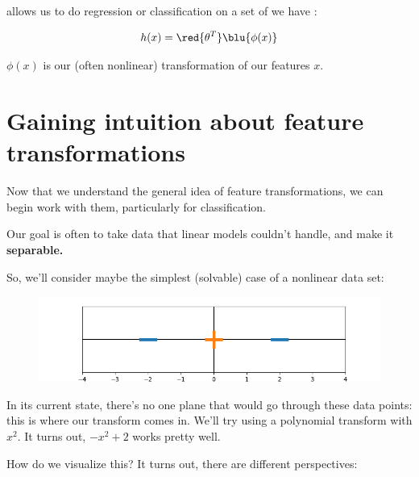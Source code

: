         \begin{definition}
             allows us to do  regression or classification on a set of  we have  :

            \begin{equation*}
                h(x) = 
            \red{\theta^T} 
            \blu{\phi(x)}
            \end{equation*}

            $\phi(x)$ is our (often nonlinear) transformation of our features $x$.
        \end{definition}

    \secdiv

    \pagebreak

    \section{Gaining intuition about feature transformations}

        Now that we understand the general idea of feature transformations, we can begin work with them, particularly for classification.

        Our goal is often to take data that linear models couldn't handle, and make it \textbf{separable.} 

        So, we'll consider maybe the simplest (solvable) case of a nonlinear data set:

        \begin{figure}[H]
            \centering
            \includegraphics[width=120mm,scale=0.5]{images/feature_images/inseparable.png}
        \end{figure}

        In its current state, there's no one plane that would go through these data points: this is where our transform comes in. We'll try using a polynomial transform with $x^2$. It turns out, $-x^2+2$ works pretty well.

        How do we visualize this? It turns out, there are different perspectives:\\

